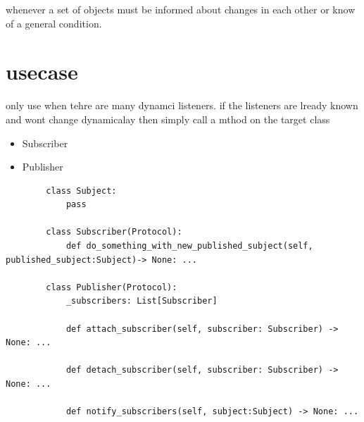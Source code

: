 whenever a set of objects must be informed about changes in each other or know of a general condition.

\section{usecase}

only use when tehre are many dynamci listeners. if the listeners are lready known and wont change dynamicalay then simply call a mthod on the target class
\begin{itemize}
    \item Subscriber
    \item Publisher
\end{itemize}
\begin{verbatim}
        class Subject:
            pass
        
        class Subscriber(Protocol):
            def do_something_with_new_published_subject(self, published_subject:Subject)-> None: ...
        
        class Publisher(Protocol):
            _subscribers: List[Subscriber]
        
            def attach_subscriber(self, subscriber: Subscriber) -> None: ...
        
            def detach_subscriber(self, subscriber: Subscriber) -> None: ...
        
            def notify_subscribers(self, subject:Subject) -> None: ...
\end{verbatim}